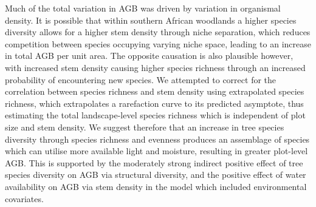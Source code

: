 \begin{refsection}
Much of the total variation in AGB was driven by variation in organismal density. It is possible that within southern African woodlands a higher species diversity allows for a higher stem density through niche separation, which reduces competition between species occupying varying niche space, leading to an increase in total AGB per unit area. The opposite causation is also plausible however, with increased stem density causing higher species richness through an increased probability of encountering new species. We attempted to correct for the correlation between species richness and stem density using extrapolated species richness, which extrapolates a rarefaction curve to its predicted asymptote, thus estimating the total landscape-level species richness which is independent of plot size and stem density. We suggest therefore that an increase in tree species diversity through species richness and evenness produces an assemblage of species which can utilise more available light and moisture, resulting in greater plot-level AGB. This is supported by the moderately strong indirect positive effect of tree species diversity on AGB via structural diversity, and the positive effect of water availability on AGB via stem density in the model which included environmental covariates. 


\end{refsection}
